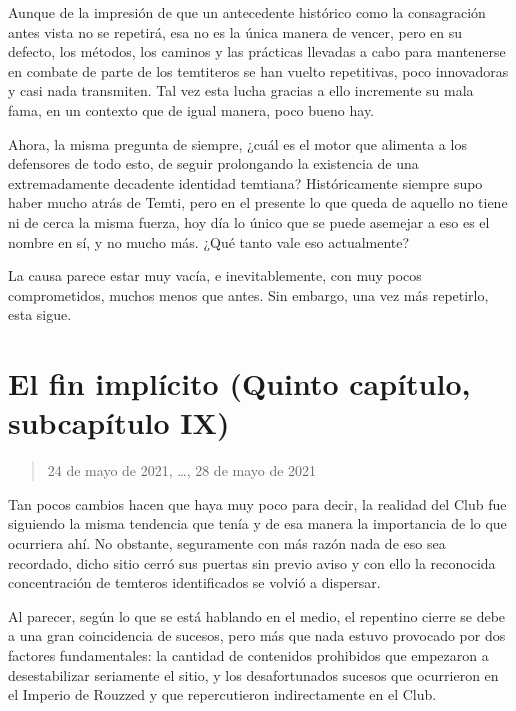 \documentclass[
  spanish,
]{book}
\begin{document}
Aunque de la impresión de que un antecedente histórico como la consagración antes vista no se repetirá, esa no es la única manera de vencer, pero en su defecto, los métodos, los caminos y las prácticas llevadas a cabo para mantenerse en combate de parte de los temtiteros se han vuelto repetitivas, poco innovadoras y casi nada transmiten. Tal vez esta lucha gracias a ello incremente su mala fama, en un contexto que de igual manera, poco bueno hay.

Ahora, la misma pregunta de siempre, ¿cuál es el motor que alimenta a los defensores de todo esto, de seguir prolongando la existencia de una extremadamente decadente identidad temtiana? Históricamente siempre supo haber mucho atrás de Temti, pero en el presente lo que queda de aquello no tiene ni de cerca la misma fuerza, hoy día lo único que se puede asemejar a eso es el nombre en sí, y no mucho más. ¿Qué tanto vale eso actualmente?

La causa parece estar muy vacía, e inevitablemente, con muy pocos comprometidos, muchos menos que antes. Sin embargo, una vez más repetirlo, esta sigue.

\hypertarget{el-fin-impluxedcito-quinto-capuxedtulo-subcapuxedtulo-ix}{%
\section{El fin implícito (Quinto capítulo, subcapítulo IX)}\label{el-fin-impluxedcito-quinto-capuxedtulo-subcapuxedtulo-ix}}

\begin{quote}
24 de mayo de 2021, \ldots, 28 de mayo de 2021
\end{quote}

Tan pocos cambios hacen que haya muy poco para decir, la realidad del Club fue siguiendo la misma tendencia que tenía y de esa manera la importancia de lo que ocurriera ahí. No obstante, seguramente con más razón nada de eso sea recordado, dicho sitio cerró sus puertas sin previo aviso y con ello la reconocida concentración de temteros identificados se volvió a dispersar.

Al parecer, según lo que se está hablando en el medio, el repentino cierre se debe a una gran coincidencia de sucesos, pero más que nada estuvo provocado por dos factores fundamentales: la cantidad de contenidos prohibidos que empezaron a desestabilizar seriamente el sitio, y los desafortunados sucesos que ocurrieron en el Imperio de Rouzzed y que repercutieron indirectamente en el Club.
\end{document}

